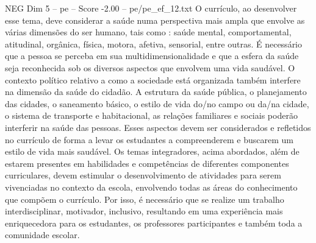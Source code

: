 \begin{textsample}{NEG Dim 5 – pe – Score -2.00 – pe/pe\_ef\_12.txt}
O currículo, ao desenvolver esse tema, deve considerar a saúde numa perspectiva mais ampla que envolve as várias dimensões do ser humano, tais como : saúde mental, comportamental, atitudinal, orgânica, física, motora, afetiva, sensorial, entre outras.
É necessário que a pessoa se perceba em sua multidimensionalidade e que a esfera da saúde seja reconhecida sob os diversos aspectos que envolvem uma vida saudável.
O contexto político relativo a como a sociedade está organizada também interfere na dimensão da saúde do cidadão.
A estrutura da saúde pública, o planejamento das cidades, o saneamento básico, o estilo de vida do/no campo ou da/na cidade, o sistema de transporte e habitacional, as relações familiares e sociais poderão interferir na saúde das pessoas.
Esses aspectos devem ser considerados e refletidos no currículo de forma a levar os estudantes a compreenderem e buscarem um estilo de vida mais saudável.
Os temas integradores, acima abordados, além de estarem presentes em habilidades e competências de diferentes componentes curriculares, devem estimular o desenvolvimento de atividades para serem vivenciadas no contexto da escola, envolvendo todas as áreas do conhecimento que compõem o currículo.
Por isso, é necessário que se realize um trabalho interdisciplinar, motivador, inclusivo, resultando em uma experiência mais enriquecedora para os estudantes, os professores participantes e também toda a comunidade escolar.

\end{textsample}
